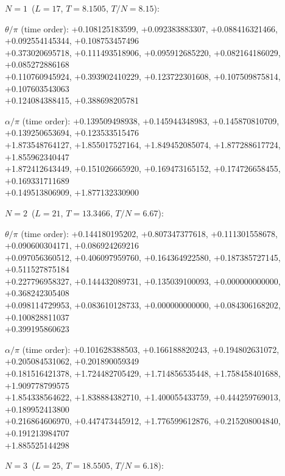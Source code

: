 \begin{flushleft}\footnotesize\ttfamily
\vspace{3pt}\par\noindent\textbf{$N=1$}\ ($L=17$, $T=8.1505$, $T/N=8.15$):
\par\noindent$\theta/\pi$ (time order):
+0.108125183599, +0.092383883307, +0.088416321466, +0.092554145344, +0.108753457496 \\
+0.373020695718, +0.111493518906, +0.095912685220, +0.082164186029, +0.085272886168 \\
+0.110760945924, +0.393902410229, +0.123722301608, +0.107509875814, +0.107603543063 \\
+0.124084388415, +0.388698205781
\par\noindent$\alpha/\pi$ (time order):
+0.139509498938, +0.145944348983, +0.145870810709, +0.139250653694, +0.123533515476 \\
+1.873548764127, +1.855017527164, +1.849452085074, +1.877288617724, +1.855962340447 \\
+1.872412643449, +0.151026665920, +0.169473165152, +0.174726658455, +0.169331711689 \\
+0.149513806909, +1.877132330900
\vspace{3pt}\par\noindent\textbf{$N=2$}\ ($L=21$, $T=13.3466$, $T/N=6.67$):
\par\noindent$\theta/\pi$ (time order):
+0.144180195202, +0.807347377618, +0.111301558678, +0.090600304171, +0.086924269216 \\
+0.097056360512, +0.406097959760, +0.164364922580, +0.187385727145, +0.511527875184 \\
+0.227796958327, +0.144432089731, +0.135039100093, +0.000000000000, +0.368242305408 \\
+0.098114729953, +0.083610128733, +0.000000000000, +0.084306168202, +0.100828811037 \\
+0.399195860623
\par\noindent$\alpha/\pi$ (time order):
+0.101628388503, +0.166188820243, +0.194802631072, +0.205084531062, +0.201890059349 \\
+0.181516421378, +1.724482705429, +1.714856535448, +1.758458401688, +1.909778799575 \\
+1.854338564622, +1.838884382710, +1.400055433759, +0.444259769013, +0.189952413800 \\
+0.216864606970, +0.447473445912, +1.776599612876, +0.215208004840, +0.191213984707 \\
+1.885525144298
\vspace{3pt}\par\noindent\textbf{$N=3$}\ ($L=25$, $T=18.5505$, $T/N=6.18$):

\end{flushleft}
